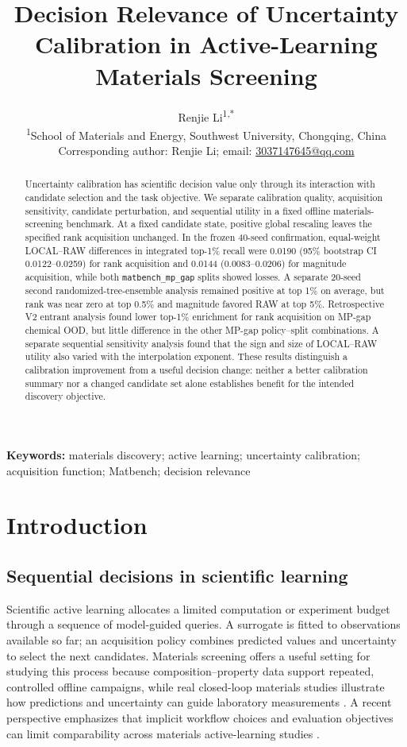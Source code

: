 \documentclass[11pt]{article}
\title{Decision Relevance of Uncertainty Calibration in Active-Learning Materials Screening}
\author{Renjie Li\textsuperscript{1,*}\\
\small \textsuperscript{1}School of Materials and Energy, Southwest University, Chongqing, China\\
\small *Corresponding author: Renjie Li; email: \href{mailto:3037147645@qq.com}{3037147645@qq.com}}
\date{}
\newcommand{\code}[1]{\texttt{#1}}
\begin{document}
\maketitle

\begin{abstract}
Uncertainty calibration has scientific decision value only through its interaction with candidate selection and the task objective. We separate calibration quality, acquisition sensitivity, candidate perturbation, and sequential utility in a fixed offline materials-screening benchmark. At a fixed candidate state, positive global rescaling leaves the specified rank acquisition unchanged. In the frozen 40-seed confirmation, equal-weight LOCAL--RAW differences in integrated top-1\% recall were 0.0190 (95\% bootstrap CI 0.0122--0.0259) for rank acquisition and 0.0144 (0.0083--0.0206) for magnitude acquisition, while both \code{matbench\_mp\_gap} splits showed losses. A separate 20-seed second randomized-tree-ensemble analysis remained positive at top 1\% on average, but rank was near zero at top 0.5\% and magnitude favored RAW at top 5\%. Retrospective V2 entrant analysis found lower top-1\% enrichment for rank acquisition on MP-gap chemical OOD, but little difference in the other MP-gap policy--split combinations. A separate sequential sensitivity analysis found that the sign and size of LOCAL--RAW utility also varied with the interpolation exponent. These results distinguish a calibration improvement from a useful decision change: neither a better calibration summary nor a changed candidate set alone establishes benefit for the intended discovery objective.
\end{abstract}

\noindent\textbf{Keywords:} materials discovery; active learning; uncertainty calibration; acquisition function; Matbench; decision relevance

\section{Introduction}
\subsection{Sequential decisions in scientific learning}
Scientific active learning allocates a limited computation or experiment budget through a sequence of model-guided queries. A surrogate is fitted to observations available so far; an acquisition policy combines predicted values and uncertainty to select the next candidates. Materials screening offers a useful setting for studying this process because composition--property data support repeated, controlled offline campaigns, while real closed-loop materials studies illustrate how predictions and uncertainty can guide laboratory measurements \citep{dunn2020matbench,kusne2020cameo,rao2022highentropy}. A recent perspective emphasizes that implicit workflow choices and evaluation objectives can limit comparability across materials active-learning studies \citep{nair2026critical}.
\end{document}

